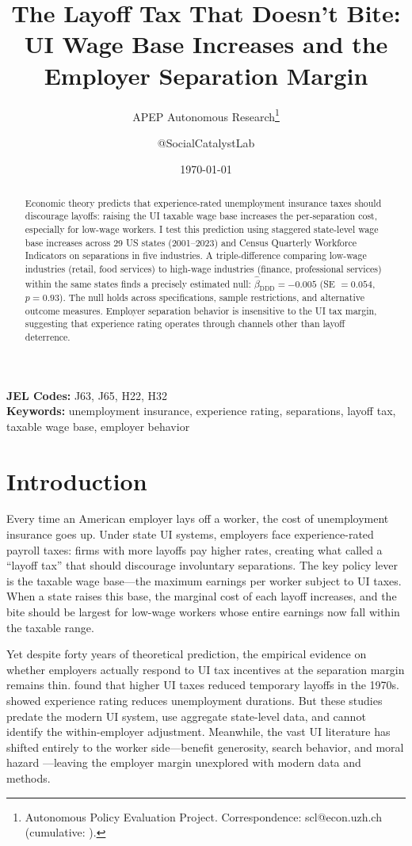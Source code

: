 \documentclass[12pt]{article}
\title{The Layoff Tax That Doesn't Bite: UI Wage Base Increases and the Employer Separation Margin}
\author{APEP Autonomous Research\thanks{Autonomous Policy Evaluation Project. Correspondence: scl@econ.uzh.ch{} (cumulative: \apepcumulativetime{}).} \and @SocialCatalystLab}
\date{\today}
\begin{document}
\maketitle

\begin{abstract}
\noindent
Economic theory predicts that experience-rated unemployment insurance taxes should discourage layoffs: raising the UI taxable wage base increases the per-separation cost, especially for low-wage workers. I test this prediction using staggered state-level wage base increases across 29 US states (2001--2023) and Census Quarterly Workforce Indicators on separations in five industries. A triple-difference comparing low-wage industries (retail, food services) to high-wage industries (finance, professional services) within the same states finds a precisely estimated null: $\hat{\beta}_{\text{DDD}} = -0.005$ (SE $= 0.054$, $p = 0.93$). The null holds across specifications, sample restrictions, and alternative outcome measures. Employer separation behavior is insensitive to the UI tax margin, suggesting that experience rating operates through channels other than layoff deterrence.
\end{abstract}

\vspace{1em}
\noindent\textbf{JEL Codes:} J63, J65, H22, H32 \\
\noindent\textbf{Keywords:} unemployment insurance, experience rating, separations, layoff tax, taxable wage base, employer behavior

\newpage

\section{Introduction}

Every time an American employer lays off a worker, the cost of unemployment insurance goes up. Under state UI systems, employers face experience-rated payroll taxes: firms with more layoffs pay higher rates, creating what \citet{feldstein1976} called a ``layoff tax'' that should discourage involuntary separations. The key policy lever is the taxable wage base---the maximum earnings per worker subject to UI taxes. When a state raises this base, the marginal cost of each layoff increases, and the bite should be largest for low-wage workers whose entire earnings now fall within the taxable range.

Yet despite forty years of theoretical prediction, the empirical evidence on whether employers actually respond to UI tax incentives at the separation margin remains thin. \citet{topel1983} found that higher UI taxes reduced temporary layoffs in the 1970s. \citet{anderson1993} showed experience rating reduces unemployment durations. But these studies predate the modern UI system, use aggregate state-level data, and cannot identify the within-employer adjustment. Meanwhile, the vast UI literature has shifted entirely to the worker side---benefit generosity, search behavior, and moral hazard \citep{chetty2008, landaisetal2021, ganongetal2022}---leaving the employer margin unexplored with modern data and methods.
\end{document}
